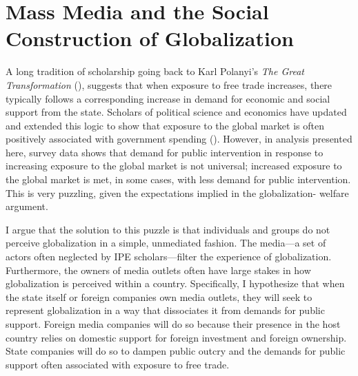 \documentclass[12pt]{report}
\begin{document}

\chapter{Mass Media and the Social Construction of Globalization}

A long tradition of scholarship going back to Karl Polanyi's \emph{The Great Transformation}
(\citeyear{Polanyi:2001vc}), suggests that when exposure to free trade increases, there typically
follows a corresponding increase in demand for economic and social support from the state. Scholars
of political science and economics have updated and extended this logic to show that exposure to the
global market is often positively associated with government spending (\citealt{Adsera:2002vt,
Cameron:1978vb, Garrett:1998wl,Rodrik:1998te}). However, in analysis presented here, survey data
shows that demand for public intervention in response to increasing exposure to the global market is
not universal; increased exposure to the global market is met, in some cases, with less demand for
public intervention. This is very puzzling, given the expectations implied in the globalization-
welfare argument.

	I argue that the solution to this puzzle is that individuals and groups do not perceive
	globalization in a simple, unmediated fashion. The media---a set of actors often neglected by
	IPE scholars---filter the experience of globalization. Furthermore, the owners of media outlets
	often have large stakes in how globalization is perceived within a country. Specifically, I
	hypothesize that when the state itself or foreign companies own media outlets, they will seek to
	represent globalization in a way that dissociates it from demands for public support. Foreign
	media companies will do so because their presence in the host country relies on domestic support
	for foreign investment and foreign ownership. State companies will do so to dampen public outcry
	and the demands for public support often associated with exposure to free trade.
\end{document}
